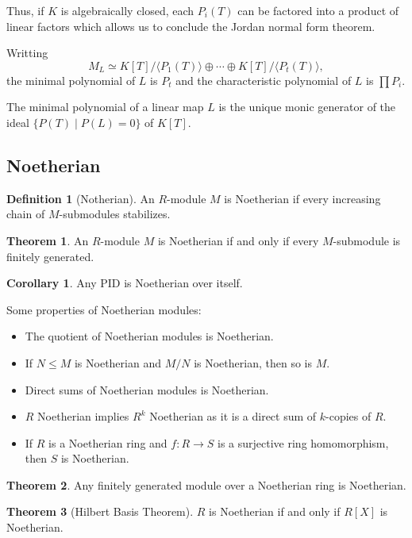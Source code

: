 \documentclass[]{article}
\theoremstyle{definition}
\newtheorem*{theorem}{Theorem}
\newtheorem*{corollary}{Corollary}
\newtheorem*{definition}{Definition}
\begin{document}
Thus, if \(K\) is algebraically closed, each \(P_i(T)\) can be factored into a product of 
linear factors which allows us to conclude the Jordan normal form theorem.

Writting 
\[M_L \simeq K[T] / \langle P_1(T) \rangle \oplus \cdots \oplus K[T] / \langle P_t(T) \rangle,\]
the minimal polynomial of \(L\) is \(P_t\) and the characteristic polynomial of \(L\) 
is \(\prod P_i\).

The minimal polynomial of a linear map \(L\) is the unique monic generator of the ideal 
\(\{P(T) \mid P(L) = 0\}\) of \(K[T]\).

\subsection*{Noetherian}

\begin{definition}[Notherian]
  An \(R\)-module \(M\) is Noetherian if every increasing chain of \(M\)-submodules 
  stabilizes.
\end{definition}

\begin{theorem}
  An \(R\)-module \(M\) is Noetherian if and only if every \(M\)-submodule is finitely 
  generated.
\end{theorem}

\begin{corollary}
  Any PID is Noetherian over itself.
\end{corollary}

Some properties of Noetherian modules:
\begin{itemize}
  \item The quotient of Noetherian modules is Noetherian.
  \item If \(N \le M\) is Noetherian and \(M / N\) is Noetherian, then so is \(M\).
  \item Direct sums of Noetherian modules is Noetherian.
  \item \(R\) Noetherian implies \(R^k\) Noetherian as it is a direct sum of \(k\)-copies of \(R\).
  \item If \(R\) is a Noetherian ring and \(f : R \to S\) is a surjective ring homomorphism, then \(S\) is Noetherian.
\end{itemize}

\begin{theorem}
  Any finitely generated module over a Noetherian ring is Noetherian.
\end{theorem}

\begin{theorem}[Hilbert Basis Theorem]
  \(R\) is Noetherian if and only if \(R[X]\) is Noetherian.
\end{theorem}
\end{document}
